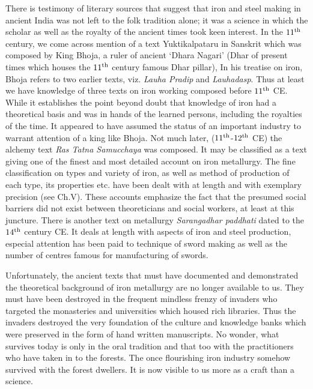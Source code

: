 There is testimony of literary sources that suggest that iron and steel making in ancient India was not left to the folk tradition alone; it was a science in which the scholar as well as the royalty of the ancient times took keen interest. In the $11^{\rm th}$ century, we come across mention of a text Yuktikalpataru in Sanskrit which was composed by King Bhoja, a ruler of ancient ‘Dhara Nagari’ (Dhar of present times which houses the $11^{\rm th}$ century famous Dhar pillar), In his treatise on iron, Bhoja refers to two earlier texts, viz. {\it Lauha Pradip} and {\it Lauhadasp}. Thus at least we have knowledge of three texts on iron working composed before $11^{\rm th}$ CE. While it establishes the point beyond doubt that knowledge of iron had a theoretical basis and was in hands of the learned persons, including the royalties of the time. It appeared to have assumed the status of an important industry to warrant attention of a king like Bhoja. Not much later, ($11^{\rm th}$-$12^{\rm th}$ CE) the alchemy text {\it Ras Tatna Samucchaya} was composed. It may be classified as a text giving one of the finest and most detailed account on iron metallurgy. The fine classification on types and variety of iron, as well as method of production of each type, its properties etc. have been dealt with at length and with exemplary precision (see Ch.V). These accounts emphasize the fact that the presumed social barriers did not exist between theoreticians and social workers, at least at this juncture. There is another text on metallurgy {\it Sarangadhar paddhati}  dated to the $14^{\rm th}$ century CE. It deals at length with aspects of iron and steel production, especial attention has been paid to technique of sword making as well as the number of centres famous for manufacturing of swords. 

Unfortunately, the ancient texts that must have documented and demonstrated the theoretical background of iron metallurgy are no longer available to us. They must have been destroyed in the frequent mindless frenzy of invaders who targeted the monasteries and universities which housed rich libraries. Thus the invaders destroyed the very foundation of the culture and knowledge banks which were preserved in the form of hand written manuscripts. No wonder, what survives today is only in the oral tradition and that too with the practitioners who have taken in to the forests. The once flourishing iron industry somehow survived with the forest dwellers. It is now visible to us more as a craft than a science.

